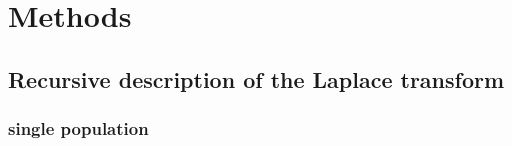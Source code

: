 \documentclass[10pt, a4]{article}
\begin{document}

\section{Methods}
\subsection{Recursive description of the Laplace transform} \label{GF_description}
\subsubsection{single population}
\end{document}

